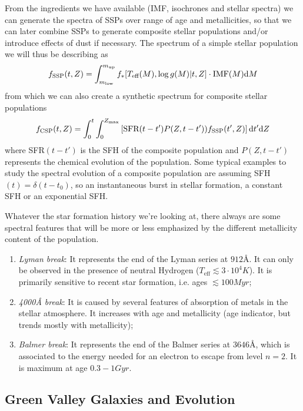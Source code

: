 \par From the ingredients we have available (IMF, isochrones and stellar spectra) we can generate the spectra of SSPs over range of age and metallicities, so that we can later combine SSPs to generate composite stellar populations and/or introduce effects of dust if necessary. The spectrum of a simple stellar population we will thus be describing as
\begin{equation}
    f_{\text{SSP}}(t,Z) = \int_{m_{\text{low}}}^{m_{\text{up}}}f_{*}[T_{\text{eff}}(M), \log g(M)|t, Z]\cdot \text{IMF}(M)\text{d}M
    \label{eq:sspspectrum}
\end{equation}
from which we can also create a synthetic spectrum for composite stellar populations
\begin{equation}
    f_{\text{CSP}}(t,Z) = \int_{0}^{t}\int_{0}^{Z_{\text{max}}}\left[\text{SFR}(t-t')P(Z, t-t'))f_{\text{SSP}}(t', Z)\right]\text{d}t'\text{d}Z
    \label{eq:cspspectrum}
\end{equation}
where SFR$(t-t')$ is the SFH of the composite population and $P(Z, t-t')$ represents the chemical evolution of the population. Some typical examples to study the spectral evolution of a composite population are assuming SFH$(t) = \delta(t-t_{0})$, so an instantaneous burst in stellar formation, a constant SFH or an exponential SFH. 
\par Whatever the star formation history we're looking at, there always are some spectral features that will be more or less emphasized by the different metallicity content of the population.
\begin{enumerate}
    \item \emph{Lyman break}: It represents the end of the Lyman series at $912\unit{Å}$. It can only be observed in the presence of neutral Hydrogen ($T_{\text{eff}}\lesssim 3\cdot 10^{4}\unit{K}$). It is primarily sensitive to recent star formation, i.e. ages $\lesssim 100\unit{Myr}$;
    \item \emph{4000Å break}: It is caused by several features of absorption of metals in the stellar atmosphere. It increases with age and metallicity (age indicator, but trends mostly with metallicity);
    \item \emph{Balmer break}: It represents the end of the Balmer series at $3646\unit{Å}$, which is associated to the energy needed for an electron to escape from level $n=2$. It is maximum at age $0.3-1\unit{Gyr}$.
\end{enumerate}

\subsection{Green Valley Galaxies and Evolution}

